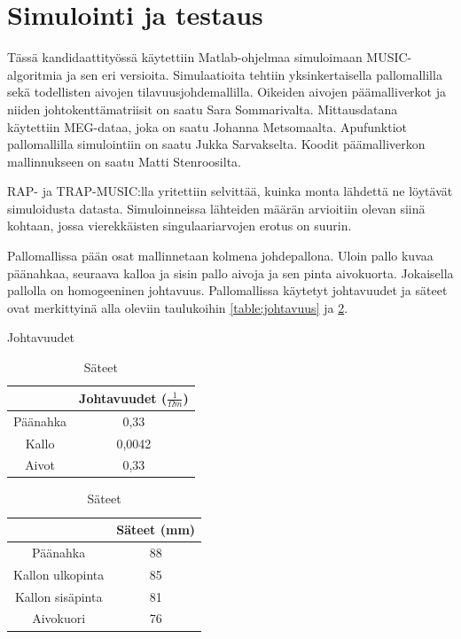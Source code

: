 \section{Simulointi ja testaus}
Tässä kandidaattityössä käytettiin Matlab-ohjelmaa simuloimaan MUSIC-algoritmia ja sen eri versioita. Simulaatioita tehtiin yksinkertaisella pallomallilla sekä todellisten aivojen tilavuusjohdemallilla. Oikeiden aivojen päämalliverkot ja niiden johtokenttämatriisit on saatu Sara Sommarivalta. Mittausdatana käytettiin MEG-dataa, joka on saatu Johanna Metsomaalta. Apufunktiot pallomallilla simulointiin on saatu Jukka Sarvakselta. Koodit päämalliverkon mallinnukseen on saatu Matti Stenroosilta.

RAP- ja TRAP-MUSIC:lla yritettiin selvittää, kuinka monta lähdettä ne löytävät simuloidusta datasta. Simuloinneissa lähteiden määrän arvioitiin olevan siinä kohtaan, jossa vierekkäisten singulaariarvojen erotus on suurin.

Pallomallissa pään osat mallinnetaan kolmena johdepallona. Uloin pallo kuvaa päänahkaa, seuraava kalloa ja sisin pallo aivoja ja sen pinta aivokuorta. Jokaisella pallolla on homogeeninen johtavuus. Pallomallissa käytetyt johtavuudet ja säteet ovat merkittyinä alla oleviin taulukoihin \ref{table:johtavuus} ja \ref{table:sateet}.

\begin{table}[h]
\begin{minipage}{0.5\textwidth}
    \caption{Johtavuudet}
    \begin{center}
        \begin{tabular}{|c|c|}
            \hline
            & Johtavuudet ($\frac{1}{\Omega m}$)\\ \hline
            Päänahka & 0,33 \\
            Kallo & 0,0042 \\
            Aivot & 0,33 \\
            \hline
        
        \end{tabular}
    \end{center}
    \label{table:johtavuus}
\end{minipage}
\begin{minipage}{0.5\textwidth}
    \caption{Säteet}
    \begin{center}
        \begin{tabular}{|c|c|}
            \hline
            & Säteet (mm)\\ \hline
            Päänahka & 88 \\
            Kallon ulkopinta & 85 \\
            Kallon sisäpinta & 81 \\
            Aivokuori & 76 \\
            \hline
        \end{tabular}
    \end{center}
    \label{table:sateet}
\end{minipage}
\end{table}

